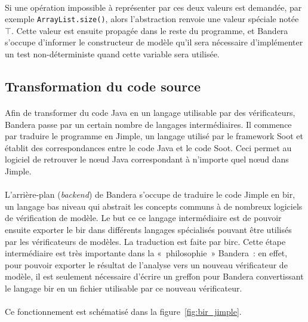 \paragraph{}
Si une opération impossible à représenter par ces deux valeurs est
demandée, par exemple \verb|ArrayList.size()|, alors l'abstraction
renvoie une valeur spéciale notée $\top$. Cette valeur est ensuite
propagée dans le reste du programme, et Bandera s'occupe d'informer le
constructeur de modèle qu'il sera nécessaire d'implémenter un test
non-déterministe quand cette variable sera utilisée.

\subsection{Transformation du code source}
\label{sec:bandera_source}

\paragraph{}
Afin de transformer du code Java en un langage utilisable par des
vérificateurs, Bandera passe par un certain nombre de langages
intermédiaires. Il commence par traduire le programme en Jimple, un
langage utilisé par le framework Soot et établit des correspondances
entre le code Java et le code Soot. Ceci permet au logiciel de
retrouver le n\oe{}ud Java correspondant à n'importe quel n\oe{}ud
dans Jimple.

\paragraph{}
L'arrière-plan (\textit{backend}) de Bandera s'occupe de traduire le
code Jimple en \gls{bir}, un langage bas niveau qui abstrait les
concepts communs à de nombreux logiciels de vérification de modèle. Le
but ce ce langage intermédiaire est de pouvoir ensuite exporter le
\gls{bir} dans différents langages spécialisés pouvant être utilisés
par les vérificateurs de modèles. La traduction est faite par
\gls{birc}. Cette étape intermédiaire est très importante dans la
«~philosophie~» Bandera~: en effet, pour pouvoir exporter le résultat
de l'analyse vers un nouveau vérificateur de modèle, il est seulement
nécessaire d'écrire un greffon pour Bandera convertissant le langage
\gls{bir} en un fichier utilisable par ce nouveau vérificateur.

\paragraph{}
Ce fonctionnement est schématisé dans la figure~\ref{fig:bir_jimple}.

